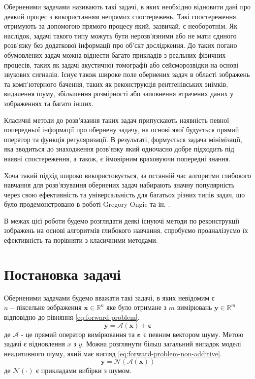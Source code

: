 \documentclass[14pt,a4paper]{extarticle}
\newcounter{e}
\numberwithin{equation}{section}
\numberwithin{figure}{section}
\begin{document}
	Оберненими задачами називають такі задачі, в яких необхідно відновити дані про деякий процес з використанням непрямих спостережень. Такі спостереження отримують за допомогою прямого процесу який, зазвичай, є необоротнім. Як наслідок, задачі такого типу можуть бути нерозв'язними або не мати єдиного розв'язку без додаткової інформації про об'єкт дослідження. До таких погано обумовлених задач можна віднести багато прикладів з реальних фізичних процесів, таких як задачі акустичної томографії або сейсморозвідки на основі звукових сигналів. Існує також широке поле обернених задач в області зображень та комп'ютерного бачення, таких як реконструкція рентгенівських знімків, видалення шуму, збільшення розмірності або заповнення втрачених даних у зображеннях та багато інших. 

	Класичні методи до розв'язання таких задач припускають наявність певної попередньої інформації про обернену задачу, на основі якої будується прямий оператор та функція регуляризації. В результаті, формується задача мінімізації, яка зводиться до знаходження розв'язку який одночасно добре підходить під наявні спостереження, а також, є ймовірним враховуючи попередні знання.
	
	Хоча такий підхід широко використовується, за останній час алгоритми глибокого навчання для розв'язування обернених задач набирають значну популярність через свою ефективність та універсальність для багатьох різних типів задач, що було продемонстровано в роботі Gregory Ongie та ін. \cite{ongie2020deep}. 
	
	В межах цієї роботи будемо розглядати деякі існуючі методи по реконструкції зображень на основі алгоритмів глибокого навчання, спробуємо проаналізуємо їх ефективність та порівняти з класичними методами.
	
	\newpage
	\thispagestyle{empty}
	\section{Постановка задачі}
		
	Оберненими задачами будемо вважати такі задачі, в яких невідомим є $n-\text{піксельне}$ зображення $\boldsymbol{x} \in \mathbb{R}^{n}$ яке було отримане з $m$ вимірювань $\boldsymbol{y} \in \mathbb{R}^{m}$ відповідно до рівняння \ref{eq:forward-problem}.
	\begin{equation}
	\label{eq:forward-problem}
	\boldsymbol{y}=\mathcal{A}\left(\boldsymbol{x}\right)+\boldsymbol{\varepsilon}
	\end{equation}
	де $\mathcal{A}$ - це прямий оператор вимірювання та $\boldsymbol{\varepsilon}$ є певним вектором шуму. Метою задачі є відновлення $x$ з $y$. Можна розглянути більш загальний випадок моделі неадитивного шуму, який має вигляд \ref{eq:forward-problem-non-additive}.
	\begin{equation}
	\label{eq:forward-problem-non-additive}
	\boldsymbol{y}=\mathcal{N}\left(\mathcal{A}\left(\boldsymbol{x}\right)\right)
	\end{equation}
	де $\mathcal{N}(\cdot)$ є прикладами вибірки з шумом.
\end{document}
